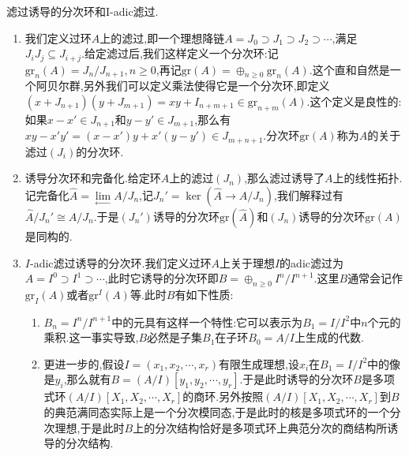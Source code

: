 滤过诱导的分次环和I-adic滤过.
\begin{enumerate}
	\item 我们定义过环$A$上的滤过,即一个理想降链$A=J_0\supset J_1\supset J_2\supset\cdots$,满足$J_iJ_j\subseteq J_{i+j}$.给定滤过后,我们这样定义一个分次环:记$\mathrm{gr}_n(A)=J_n/J_{n+1},n\ge0$,再记$\mathrm{gr}(A)=\oplus_{n\ge0}\mathrm{gr}_n(A)$.这个直和自然是一个阿贝尔群,另外我们可以定义乘法使得它是一个分次环,即定义$(x+J_{n+1})(y+J_{m+1})=xy+I_{n+m+1}\in\mathrm{gr}_{n+m}(A)$.这个定义是良性的:如果$x-x'\in J_{n+1}$和$y-y'\in J_{m+1}$,那么有$xy-x'y'=(x-x')y+x'(y-y')\in J_{m+n+1}$.分次环$\mathrm{gr}(A)$称为$A$的关于滤过$(J_i)$的分次环.
	\item 诱导分次环和完备化.给定环$A$上的滤过$(J_n)$,那么滤过诱导了$A$上的线性拓扑.记完备化$\widehat{A}=\lim\limits_{\leftarrow}A/J_n$,记$J_n'=\ker(\widehat{A}\to A/J_n)$,我们解释过有$\widehat{A}/J_n'\cong A/J_n$.于是$(J_n')$诱导的分次环$\mathrm{gr}(\widehat{A})$和$(J_n)$诱导的分次环$\mathrm{gr}(A)$是同构的.
	\item $I$-adic滤过诱导的分次环.我们定义过环$A$上关于理想$I$的adic滤过为$A=I^0\supset I^1\supset\cdots$,此时它诱导的分次环即$B=\oplus_{n\ge0}I^n/I^{n+1}$.这里$B$通常会记作$\mathrm{gr}_I(A)$或者$\mathrm{gr}^I(A)$等.此时$B$有如下性质:
	\begin{enumerate}
		\item $B_n=I^n/I^{n+1}$中的元具有这样一个特性:它可以表示为$B_1=I/I^2$中$n$个元的乘积.这一事实导致,$B$必然是子集$B_1$在子环$B_0=A/I$上生成的代数.
		\item 更进一步的,假设$I=(x_1,x_2,\cdots,x_r)$有限生成理想,设$x_i$在$B_1=I/I^2$中的像是$y_i$,那么就有$B=(A/I)[y_1,y_2,\cdots,y_r]$.于是此时诱导的分次环$B$是多项式环$(A/I)[X_1,X_2,\cdots,X_r]$的商环.另外按照$(A/I)[X_1,X_2,\cdots,X_r]$到$B$的典范满同态实际上是一个分次模同态,于是此时的核是多项式环的一个分次理想,于是此时$B$上的分次结构恰好是多项式环上典范分次的商结构所诱导的分次结构.
	\end{enumerate}
\end{enumerate}


